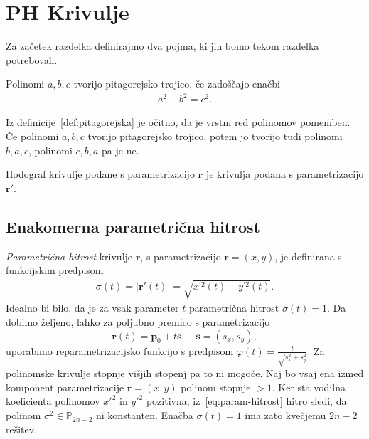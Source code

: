 \documentclass[isrm2, tisk]{fmfdelo}
\newcommand{\R}{\mathbb R}
\newcommand{\p}{\mathbf{p}}
\begin{document}
    \section{PH Krivulje}
    Za začetek razdelka definirajmo dva pojma, ki jih bomo tekom razdelka potrebovali.
    \begin{definicija}
        \label{def:pitagorejska}
        Polinomi $a,b,c$ tvorijo pitagorejsko trojico, če zadoščajo enačbi
        \begin{align*}
            a^2+b^2=c^2.
        \end{align*}
    \end{definicija}
    \begin{opomba}
        Iz definicije~\ref{def:pitagorejska} je očitno, da je vrstni red polinomov pomemben.
        Če polinomi $a,b,c$ tvorijo pitagorejsko trojico, potem jo tvorijo tudi polinomi $b,a,c$, polinomi $c,b,a$ pa je ne.
    \end{opomba}
    \begin{definicija}
        Hodograf krivulje podane s parametrizacijo $\mathbf{r}$ je krivulja podana s parametrizacijo $\mathbf{r'}$.
    \end{definicija}

    \subsection{Enakomerna parametrična hitrost}
    \textit{Parametrična hitrost} krivulje $\mathbf{r}$, s parametrizacijo $\mathbf{r}= \left(x,y\right)$, je definirana s funkcijskim predpisom
    \begin{align}
        \sigma(t)= |\mathbf{r'}(t)| = \sqrt {x^{'2}(t)+y^{'2}(t)}. \label{eq:param-hitrost}
    \end{align}
    Idealno bi bilo, da je za vsak parameter $t$ parametrična hitrost $\sigma(t) = 1$.
    Da dobimo željeno, lahko za poljubno premico s parametrizacijo
    \[\mathbf{r}(t) = \p_0 + t\mathbf{s},\quad  \mathbf{s} = (s_x,s_y),\]
    uporabimo reparametrizacijsko funkcijo s predpisom $\varphi(t) = \frac{t}{\sqrt{s_x^2+s_y^2}}$.
    Za polinomske krivulje stopnje višjih stopenj pa to ni mogoče.
    Naj bo vsaj ena izmed komponent parametrizacije $\mathbf{r}=(x,y)$ polinom stopnje $>1$.
    Ker sta vodilna koeficienta polinomov $x'^2$ in $y'^2$ pozitivna, iz~\eqref{eq:param-hitrost} hitro sledi, da polinom $\sigma^2\in\mathbb{P}_{2n-2}$ ni konstanten.
    Enačba $\sigma(t) = 1$ ima zato kvečjemu $2n-2$ rešitev.
\end{document}
